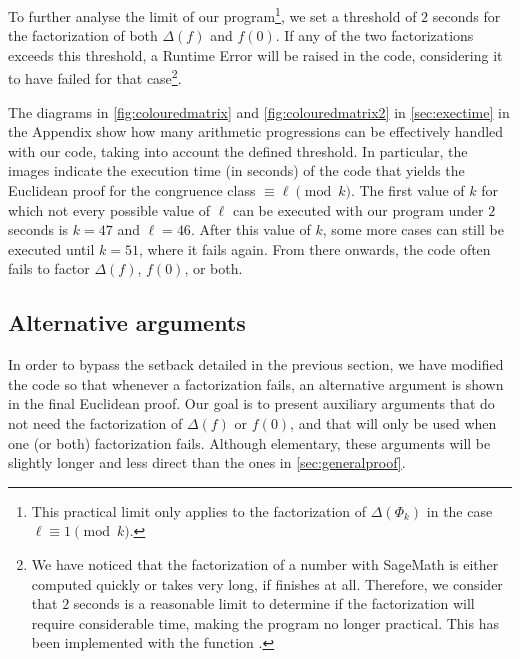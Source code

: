 \documentclass[../main.tex]{subfiles}
\begin{document}
To further analyse the limit of our program\footnote{This practical limit only applies to the factorization of $\Delta(\Phi_k)$ in the case $\ell\equiv 1\pmod{k}$.}, we set a threshold of $2$ seconds for the factorization of both $\Delta(f)$ and $f(0)$. If any of the two factorizations exceeds this threshold, a Runtime Error will be raised in the code, considering it to have failed for that case\footnote{We have noticed that the factorization of a number with SageMath is either computed quickly or takes very long, if finishes at all. Therefore, we consider that $2$ seconds is a reasonable limit to determine if the factorization will require considerable time, making the program no longer practical. This has been implemented with the function \textcolor{blue}{}.}.

The diagrams in \cref{fig:colouredmatrix} and \cref{fig:colouredmatrix2} in \cref{sec:exectime} in the Appendix show how many arithmetic progressions can be effectively handled with our code, taking into account the defined threshold. In particular, the images indicate the execution time (in seconds) of the code that yields the Euclidean proof for the congruence class $\equiv\ell\pmod{k}$. The first value of $k$ for which not every possible value of $\ell$ can be executed with our program under $2$ seconds is $k=47$ and $\ell=46$. After this value of $k$, some more cases can still be executed until $k=51$, where it fails again. From there onwards, the code often fails to factor $\Delta(f)$, $f(0)$, or both.

\subsection{Alternative arguments}\label{sec:altarguments}
In order to bypass the setback detailed in the previous section, we have modified the code so that whenever a factorization fails, an alternative argument is shown in the final Euclidean proof. Our goal is to present auxiliary arguments that do not need the factorization of $\Delta(f)$ or $f(0)$, and that will only be used when one (or both) factorization fails. Although elementary, these arguments will be slightly longer and less direct than the ones in \cref{sec:generalproof}. 
\end{document}
